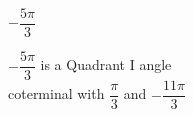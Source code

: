 {$-\dfrac{5\pi}{3}$}
{$-\dfrac{5\pi}{3}$ is a Quadrant I angle  \\
coterminal with $\dfrac{\pi}{3}$ and $-\dfrac{11\pi}{3}$ 

\begin{center}
\end{center}}